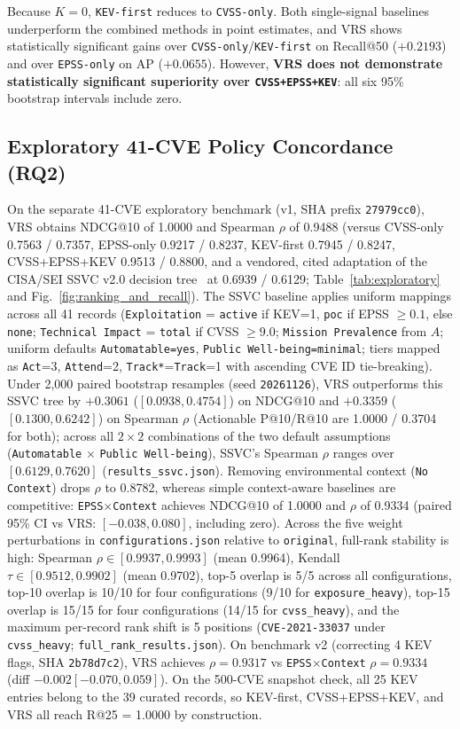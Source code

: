 \documentclass[conference]{IEEEtran}
\begin{document}
Because $K=0$, \texttt{KEV-first} reduces to \texttt{CVSS-only}. Both single-signal baselines underperform the combined methods in point estimates, and VRS shows statistically significant gains over \texttt{CVSS-only}/\texttt{KEV-first} on Recall@50 ($+0.2193$) and over \texttt{EPSS-only} on AP ($+0.0655$). However, \textbf{VRS does not demonstrate statistically significant superiority over \texttt{CVSS+EPSS+KEV}}: all six 95\% bootstrap intervals include zero.

\subsection{Exploratory 41-CVE Policy Concordance (RQ2)}
On the separate 41-CVE exploratory benchmark (v1, SHA prefix \texttt{27979cc0}), VRS obtains NDCG@10 of 1.0000 and Spearman $\rho$ of 0.9488 (versus CVSS-only 0.7563 / 0.7357, EPSS-only 0.9217 / 0.8237, KEV-first 0.7945 / 0.8247, CVSS+EPSS+KEV 0.9513 / 0.8800, and a vendored, cited adaptation of the CISA/SEI SSVC v2.0 decision tree~\cite{spring2020ssvc, cisa2024ssvc} at 0.6939 / 0.6129; Table~\ref{tab:exploratory} and Fig.~\ref{fig:ranking_and_recall}). The SSVC baseline applies uniform mappings across all 41 records (\texttt{Exploitation} = \texttt{active} if KEV=1, \texttt{poc} if EPSS $\ge 0.1$, else \texttt{none}; \texttt{Technical Impact} = \texttt{total} if CVSS $\ge 9.0$; \texttt{Mission Prevalence} from $A$; uniform defaults \texttt{Automatable=yes}, \texttt{Public Well-being=minimal}; tiers mapped as \texttt{Act}=3, \texttt{Attend}=2, \texttt{Track*}=\texttt{Track}=1 with ascending CVE ID tie-breaking). Under 2{,}000 paired bootstrap resamples (seed \texttt{20261126}), VRS outperforms this SSVC tree by $+0.3061$ ($[0.0938, 0.4754]$) on NDCG@10 and $+0.3359$ ($[0.1300, 0.6242]$) on Spearman $\rho$ (Actionable P@10/R@10 are 1.0000 / 0.3704 for both); across all $2\times2$ combinations of the two default assumptions (\texttt{Automatable} $\times$ \texttt{Public Well-being}), SSVC's Spearman $\rho$ ranges over $[0.6129, 0.7620]$ (\texttt{results\_ssvc.json}). Removing environmental context (\texttt{No Context}) drops $\rho$ to 0.8782, whereas simple context-aware baselines are competitive: \texttt{EPSS$\times$Context} achieves NDCG@10 of 1.0000 and $\rho$ of 0.9334 (paired 95\% CI vs VRS: $[-0.038, 0.080]$, including zero). Across the five weight perturbations in \texttt{configurations.json} relative to \texttt{original}, full-rank stability is high: Spearman $\rho \in [0.9937, 0.9993]$ (mean 0.9964), Kendall $\tau \in [0.9512, 0.9902]$ (mean 0.9702), top-5 overlap is 5/5 across all configurations, top-10 overlap is 10/10 for four configurations (9/10 for \texttt{exposure\_heavy}), top-15 overlap is 15/15 for four configurations (14/15 for \texttt{cvss\_heavy}), and the maximum per-record rank shift is 5 positions (\texttt{CVE-2021-33037} under \texttt{cvss\_heavy}; \texttt{full\_rank\_results.json}). On benchmark v2 (correcting 4 KEV flags, SHA \texttt{2b78d7c2}), VRS achieves $\rho = 0.9317$ vs \texttt{EPSS$\times$Context} $\rho = 0.9334$ (diff $-0.002 [-0.070, 0.059]$). On the 500-CVE snapshot check, all 25 KEV entries belong to the 39 curated records, so KEV-first, CVSS+EPSS+KEV, and VRS all reach R@25 = 1.0000 by construction.
\end{document}

